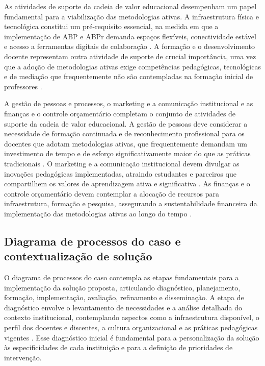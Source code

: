 As atividades de suporte da cadeia de valor educacional desempenham um papel fundamental para a viabilização das metodologias ativas. A infraestrutura física e tecnológica constitui um pré-requisito essencial, na medida em que a implementação de ABP e ABPr demanda espaços flexíveis, conectividade estável e acesso a ferramentas digitais de colaboração \cite{MEZZARI2011}. A formação e o desenvolvimento docente representam outra atividade de suporte de crucial importância, uma vez que a adoção de metodologias ativas exige competências pedagógicas, tecnológicas e de mediação que frequentemente não são contempladas na formação inicial de professores \cite{CANTANHEDE2026}.

A gestão de pessoas e processos, o marketing e a comunicação institucional e as finanças e o controle orçamentário completam o conjunto de atividades de suporte da cadeia de valor educacional. A gestão de pessoas deve considerar a necessidade de formação continuada e de reconhecimento profissional para os docentes que adotam metodologias ativas, que frequentemente demandam um investimento de tempo e de esforço significativamente maior do que as práticas tradicionais \cite{MIRANDA2022}. O marketing e a comunicação institucional devem divulgar as inovações pedagógicas implementadas, atraindo estudantes e parceiros que compartilhem os valores de aprendizagem ativa e significativa \cite{PORTER1980}. As finanças e o controle orçamentário devem contemplar a alocação de recursos para infraestrutura, formação e pesquisa, assegurando a sustentabilidade financeira da implementação das metodologias ativas ao longo do tempo \cite{FREITAS2024}.

\subsection{Diagrama de processos do caso e contextualização de solução}
\label{subsec:diagrama_processos}

O diagrama de processos do caso contempla as etapas fundamentais para a implementação da solução proposta, articulando diagnóstico, planejamento, formação, implementação, avaliação, refinamento e disseminação. A etapa de diagnóstico envolve o levantamento de necessidades e a análise detalhada do contexto institucional, contemplando aspectos como a infraestrutura disponível, o perfil dos docentes e discentes, a cultura organizacional e as práticas pedagógicas vigentes \cite{CRESWELL2018}. Esse diagnóstico inicial é fundamental para a personalização da solução às especificidades de cada instituição e para a definição de prioridades de intervenção.

